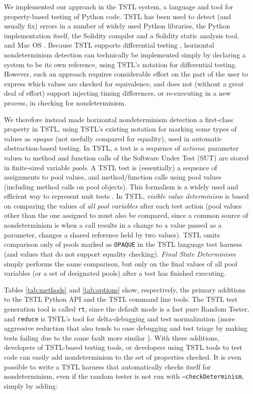 We implemented our approach in the TSTL \cite{NFM15,ISSTA15,tstlsttt} system, a
language and tool for property-based testing \cite{Hypothesis,ClaessenH00} of Python code. TSTL has
been used to detect (and usually fix) errors in a number of widely
used Python libraries, the Python implementation itself, the Solidity
compiler and a Solidity static analysis tool, and Mac OS \cite{tstl}.
Because TSTL supports differential testing \cite{tstlsttt}, horizontal
nondeterminism detection can technically be implemented simply by
declaring a system to be its own reference, using TSTL's notation for
differential testing.  However, such an approach requires considerable effort
on the part of the user to express which values are checked for
equivalence, and does not (without a great deal of effort) support injecting timing differences,
or re-executing in a new process, in checking for nondeterminism.

We therefore instead made horizontal nondeterminism detection a first-class
property in TSTL, using TSTL's existing notation for marking some
types of values as \emph{opaque} (not usefully compared for equality),
used in automatic abstraction-based testing.  In TSTL, a test is a
sequence of \emph{actions}; parameter values to method and function
calls of the Software Under Test (SUT) are stored in finite-sized variable \emph{pools}.  A
TSTL test is (essentially) a sequence of assignments to pool values,
and method/function calls using pool values (including method calls on
pool objects).  This formalism is a widely used and efficient way to
represent unit tests \cite{Pacheco,AndrewsTR}.  In TSTL, \emph{visible
value determinism} is based on comparing the values of \emph{all pool
variables} after each test action (pool values other than the one
assigned to must also be compared, since a common source of
nondeterminism is when a call results in a change to a value passed as
a parameter, changes a shared reference held by two values).
TSTL omits comparison only of pools marked as {\tt OPAQUE} in the
TSTL language test harness (and values that do not support equality
checking).  \emph{Final State Determinism} simply performs the same
comparison, but only on the final values of all pool variables (or a
set of designated pools) after a test has
finished executing.

 Tables \ref{tab:methods}
and \ref{tab:options} show, respectively, the primary additions to the
TSTL Python API and the TSTL command line tools.  The TSTL test
generation tool is called {\tt rt}, since the default mode is a fast
pure Random Tester, and {\tt reduce} is TSTL's tool for
delta-debugging and test
normalization (more aggressive reduction that also tends to ease
debugging and test triage by making tests failing due to the same
fault more similar \cite{onetest}).  With these additions,
developers of TSTL-based testing tools, or developers using TSTL tools
to test code can easily add nondeterminism to the set of properties
checked.  It is even possible to write a TSTL harness that
automatically checks itself for nondeterminism, even if the random
tester is not run with {\tt --checkDeterminism}, simply by adding:

